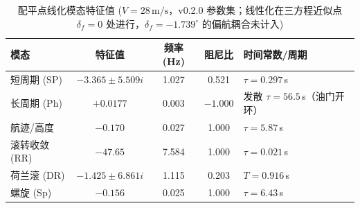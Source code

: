 \begin{table}[H]
\centering
\caption{配平点线化模态特征值 ($V=28\,\text{m/s}$，v0.2.0 参数集；线性化在三方程近似点 $\delta_f=0$ 处进行，$\delta_f=-1.739^\circ$ 的偏航耦合未计入)}
\label{tab:modes}
\small
\begin{tabularx}{\textwidth}{l c c c X}
\toprule
\textbf{模态} & \textbf{特征值} & \textbf{频率 (Hz)} & \textbf{阻尼比} & \textbf{时间常数/周期} \\
\midrule
  短周期 (SP) & $-3.365 \pm 5.509i$ & 1.027 & 0.521 & $\tau=0.297$\,s \\
  长周期 (Ph) & $+0.0177$ & 0.003 & $-1.000$ & 发散 $\tau=56.5$\,s（油门开环） \\
  航迹/高度 & $-0.170$ & 0.027 & 1.000 & $\tau=5.87$\,s \\
  滚转收敛 (RR) & $-47.65$ & 7.584 & 1.000 & $\tau=0.021$\,s \\
  荷兰滚 (DR) & $-1.425 \pm 6.861i$ & 1.115 & 0.203 & $T=0.916$\,s \\
  螺旋 (Sp) & $-0.156$ & 0.025 & 1.000 & $\tau=6.43$\,s \\
\bottomrule
\end{tabularx}
\end{table}
